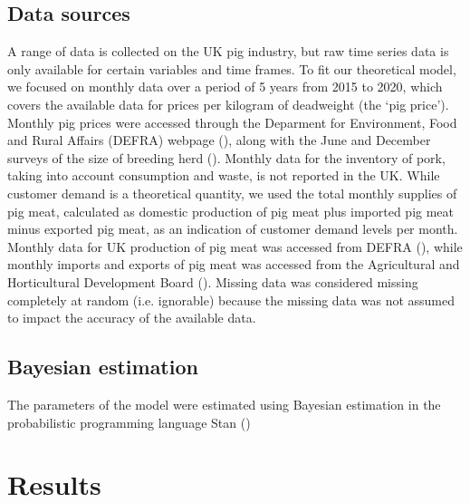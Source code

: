 \documentclass[12pt]{article}
\begin{document}
\subsection{Data sources}
A range of data is collected on the UK pig industry, but raw time series data is only available for certain variables and time frames. To fit our theoretical model, we focused on monthly data over a period of 5 years from 2015 to 2020, which covers the available data for prices per kilogram of deadweight (the `pig price'). Monthly pig prices were accessed through the Deparment for Environment, Food and Rural Affairs (DEFRA) webpage (\cite{DEFRAlivestockprices}), along with the June and December surveys of the size of breeding herd (\cite{DEFRAlivestocknumbers}). Monthly data for the inventory of pork, taking into account consumption and waste, is not reported in the UK. While customer demand is a theoretical quantity, we used the total monthly supplies of pig meat, calculated as domestic production of pig meat plus imported pig meat minus exported pig meat, as an indication of customer demand levels per month. Monthly data for UK production of pig meat was accessed from DEFRA (\cite{DEFRApigcattlestats2020}), while monthly imports and exports of pig meat was accessed from the Agricultural and Horticultural Development Board (\cite{AHDBpigmeatrade}). Missing data was considered missing completely at random (i.e. ignorable) because the missing data was not assumed to impact the accuracy of the available data. 

\subsection{Bayesian estimation}
The parameters of the model were estimated using Bayesian estimation in the probabilistic programming language Stan ()


\section{Results}
\end{document}
